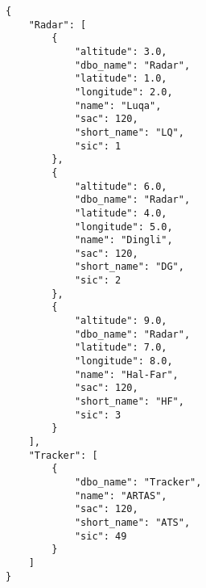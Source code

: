 \begin{lstlisting}
{
    "Radar": [
        {
            "altitude": 3.0,
            "dbo_name": "Radar",
            "latitude": 1.0,
            "longitude": 2.0,
            "name": "Luqa",
            "sac": 120,
            "short_name": "LQ",
            "sic": 1
        },
        {
            "altitude": 6.0,
            "dbo_name": "Radar",
            "latitude": 4.0,
            "longitude": 5.0,
            "name": "Dingli",
            "sac": 120,
            "short_name": "DG",
            "sic": 2
        },
        {
            "altitude": 9.0,
            "dbo_name": "Radar",
            "latitude": 7.0,
            "longitude": 8.0,
            "name": "Hal-Far",
            "sac": 120,
            "short_name": "HF",
            "sic": 3
        }
    ],
    "Tracker": [
        {
            "dbo_name": "Tracker",
            "name": "ARTAS",
            "sac": 120,
            "short_name": "ATS",
            "sic": 49
        }
    ]
}
\end{lstlisting}
